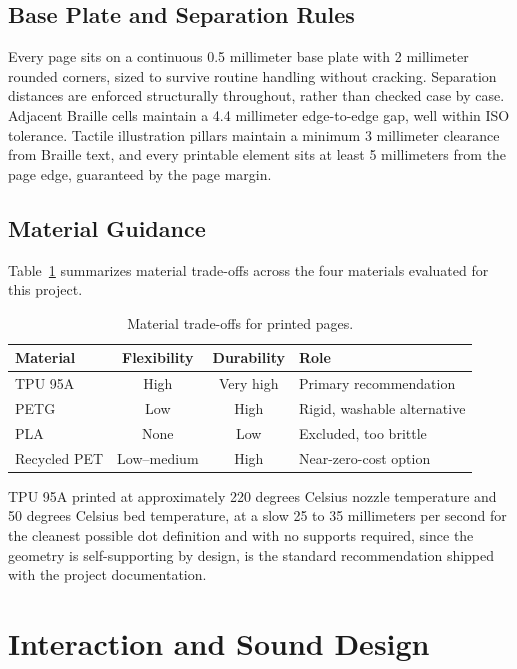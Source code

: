 \documentclass[conference]{IEEEtran}
\begin{document}
\subsection{Base Plate and Separation Rules}

Every page sits on a continuous 0.5 millimeter base plate with 2 millimeter rounded corners, sized to survive routine handling without cracking. Separation distances are enforced structurally throughout, rather than checked case by case. Adjacent Braille cells maintain a 4.4 millimeter edge-to-edge gap, well within ISO tolerance. Tactile illustration pillars maintain a minimum 3 millimeter clearance from Braille text, and every printable element sits at least 5 millimeters from the page edge, guaranteed by the page margin.

\subsection{Material Guidance}

Table~\ref{tab:materials} summarizes material trade-offs across the four materials evaluated for this project.

\begin{table}[t]
\caption{Material trade-offs for printed pages.}
\label{tab:materials}
\centering
\begin{tabular}{lccl}
\toprule
Material & Flexibility & Durability & Role \\
\midrule
TPU 95A & High & Very high & Primary recommendation \\
PETG & Low & High & Rigid, washable alternative \\
PLA & None & Low & Excluded, too brittle \\
Recycled PET & Low--medium & High & Near-zero-cost option \\
\bottomrule
\end{tabular}
\end{table}

TPU 95A printed at approximately 220 degrees Celsius nozzle temperature and 50 degrees Celsius bed temperature, at a slow 25 to 35 millimeters per second for the cleanest possible dot definition and with no supports required, since the geometry is self-supporting by design, is the standard recommendation shipped with the project documentation.

\section{Interaction and Sound Design}\label{sec:sound}
\end{document}
